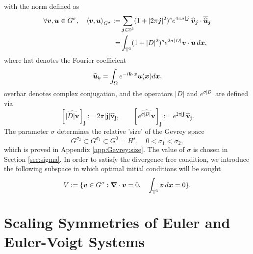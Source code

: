 with the norm defined as
\begin{subequations}\label{eq:Gevrey:Inner:Product}
\begin{align}
\forall \boldsymbol v,\boldsymbol u \in G^\sigma, \quad \left\langle \boldsymbol v,\boldsymbol u \right\rangle_{G^\sigma} :=& \sum_{\boldsymbol j\in \mathbb{Z}^3} (1+|2\pi \boldsymbol j|^2)^se^{4\pi\sigma|\boldsymbol j|}\widehat{\boldsymbol v}_{\boldsymbol j}\cdot \overline{\widehat{\boldsymbol u}}_{\boldsymbol j} \\
=& \int_{\mathbb{T}^3}(1+|D|^2)^se^{2\sigma |D|}\boldsymbol v\cdot \boldsymbol u \, d\boldsymbol x,
\end{align}
\end{subequations}
where hat denotes the Fourier coefficient
\begin{equation}\label{eq:Fourier:Coefficient}
\widehat{\boldsymbol u}_k = \int_{\Omega}e^{-i\boldsymbol k\cdot\boldsymbol x}\boldsymbol u(\boldsymbol x)d\boldsymbol x,
\end{equation}
\noindent overbar denotes complex conjugation, and the operators $|D|$ and $e^{\sigma|D|}$ are defined via
\begin{equation}\label{eq:D}
\left[ \widehat{|D|\boldsymbol v} \right]_{\boldsymbol j} := 2\pi|\boldsymbol j|\boldsymbol{\hat{v}_j}, \qquad \left[ \widehat{e^{\sigma |D|}\boldsymbol v} \right]_{\boldsymbol j} := e^{2\pi|\boldsymbol j|}\boldsymbol{\hat{v}_j}.
\end{equation}
The parameter $\sigma$ determines the relative 'size' of the Gevrey space
\begin{equation}\label{eq:Gevrey:size}
G^{\sigma_2} \subset G^{\sigma_1} \subset G^0 = H^s, \quad 0 < \sigma_1 < \sigma_2,
\end{equation}
which is proved in Appendix \ref{app:Gevrey:size}. The value of $\sigma$ is chosen in Section \ref{sec:sigma}. In order to satisfy the divergence free condition, we introduce the following subspace in which optimal initial conditions will be sought
\begin{equation}\label{eq:subspace:v}
V := \{\boldsymbol v \in G^\sigma : \boldsymbol \nabla \cdot \boldsymbol v = 0, \quad \int_{\mathbb{T}^3}\boldsymbol v\, d\boldsymbol x = 0\}.
\end{equation}

\section{Scaling Symmetries of Euler and Euler-Voigt Systems}\label{sec:scaling}

